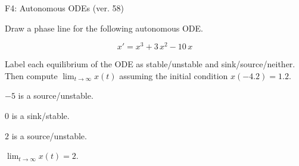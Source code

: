 \begin{exercise}
  \begin{exerciseTitle}F4: Autonomous ODEs (ver. 58)\end{exerciseTitle}
  \begin{exerciseStatement}
    

      Draw a phase line for the following 
      autonomous ODE.
    

    
\[x'= x^{3} + 3 \, x^{2} - 10 \, x\]

    

      Label each equilibrium of the ODE
      as stable/unstable and sink/source/neither.
      Then compute \(\lim_{t\to\infty}x(t)\)
      assuming the initial condition
      \(x( -4.2 )= 1.2\).
    

  \end{exerciseStatement}
  \begin{exerciseAnswer}
    

      \(-5\) is a source/unstable.
      
        \(0\) is a sink/stable.
      
      \(2\) is a source/unstable.
    

    

      \(\lim_{t\to\infty}x(t)=2\).
    

  \end{exerciseAnswer}
\end{exercise}